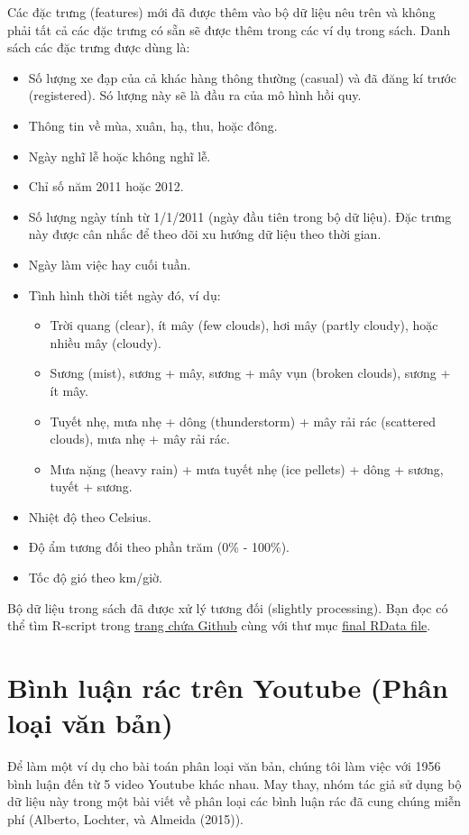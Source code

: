 Các đặc trưng (features) mới đã được thêm vào bộ dữ liệu nêu trên và không phải tất cả các đặc trưng có sẵn sẽ được thêm trong các ví dụ trong sách. Danh sách các đặc trưng được dùng là:
\begin{itemize}
    \item Số lượng xe đạp của cả khác hàng thông thường (casual) và đã đăng kí trước (registered). Só lượng này sẽ là đầu ra của mô hình hồi quy. 
    \item Thông tin về mùa, xuân, hạ, thu, hoặc đông.
    \item Ngày nghĩ lễ hoặc không nghĩ lễ. 
    \item Chỉ số năm 2011 hoặc 2012.
    \item Số lượng ngày tính từ 1/1/2011 (ngày đầu tiên trong bộ dữ liệu). Đặc trưng này được cân nhắc để theo dõi xu hướng dữ liệu theo thời gian.
    \item Ngày làm việc hay cuối tuần. 
    \item Tình hình thời tiết ngày đó, ví dụ:
    \begin{itemize}
        \item Trời quang (clear), ít mây (few clouds), hơi mây (partly cloudy), hoặc nhiều mây (cloudy).
        \item Sương (mist), sương + mây, sương + mây vụn (broken clouds), sương + ít mây.
        \item Tuyết nhẹ, mưa nhẹ + dông (thunderstorm) + mây rải rác (scattered clouds), mưa nhẹ + mây rải rác.
        \item Mưa nặng (heavy rain) + mưa tuyết nhẹ (ice pellets) + dông + sương, tuyết + sương.
    \end{itemize}
    \item Nhiệt độ theo Celsius.
    \item Độ ẩm tương đối theo phần trăm (0\% -  100\%).
    \item Tốc độ gió theo km/giờ.
\end{itemize}
Bộ dữ liệu trong sách đã được xử lý tương đối (slightly processing). Bạn đọc có thể tìm R-script trong \href{https://github.com/christophM/interpretable-ml-book/blob/master/R/get-bike-sharing-dataset.R}{trang chứa Github} cùng với thư mục \href{https://github.com/christophM/interpretable-ml-book/blob/master/data/bike.RData}{final RData file}.

\clearpage

\section{Bình luận rác trên Youtube (Phân loại văn bản)}
Để làm một ví dụ cho bài toán phân loại văn bản, chúng tôi làm việc với 1956 bình luận đến từ 5 video Youtube khác nhau. May thay, nhóm tác giả sử dụng bộ dữ liệu này trong một bài viết về phân loại các bình luận rác đã cung chúng miễn phí (Alberto, Lochter, và Almeida (2015)).

